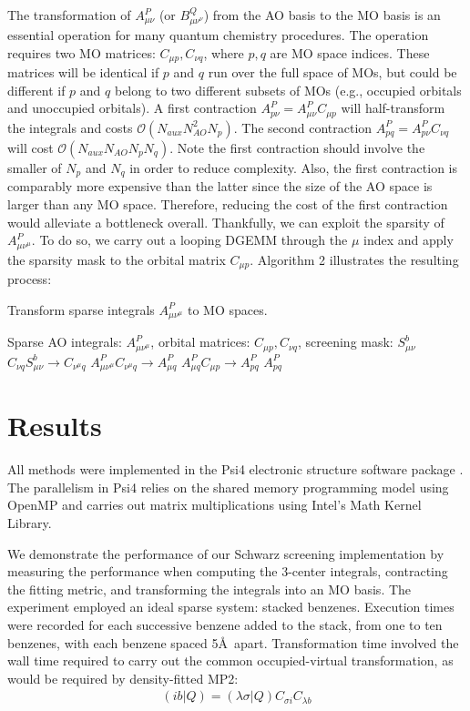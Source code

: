 The transformation of $A_{\mu \nu}^P$ (or $B_{\mu \nu^\nu}^Q$) from the AO basis to the MO basis is 
an essential operation for many quantum 
chemistry procedures. The operation requires two MO matrices: $C_{\mu p}, C_{\nu q}$, where $p, q$ are MO space
indices. These matrices will be identical if $p$ and $q$ run over the full space of MOs, but could be different if $p$ and $q$
belong to two different subsets of MOs (e.g., occupied orbitals and unoccupied orbitals).
A first contraction $A_{p \nu}^P=A_{\mu \nu}^PC_{\mu p}$ will half-transform the integrals and costs 
$\mathcal{O}(N_{aux}N_{AO}^2N_p)$. The second contraction $A_{p q}^P=A_{p \nu}^PC_{\nu q}$ will cost
$\mathcal{O}(N_{aux}N_{AO}N_pN_q)$.
Note the first contraction should involve the smaller of $N_p$ and $N_q$ in order to reduce complexity. Also, the first contraction
is comparably more expensive than the latter since the size of the AO space is larger than any MO space. Therefore,
reducing the cost of the first contraction would alleviate a bottleneck overall. 
Thankfully, we can exploit the sparsity of $A_{\mu \nu^\mu}^P$.
To do so, we carry out a looping DGEMM through the $\mu$ index and apply the sparsity mask to the orbital matrix $C_{\mu p}$.
Algorithm 2 illustrates the resulting process:

\begin{algorithm}[H]
\caption{Transform sparse integrals $A_{\mu \nu^\mu}^P$ to MO spaces.}
\begin{algorithmic}
\REQUIRE Sparse AO integrals: $A_{\mu \nu^\mu}^P$, orbital matrices: $C_{\mu p}, C_{\nu q}$, screening mask: $S_{\mu \nu}^b$
    \STATE $C_{\nu q}S_{\mu \nu}^b \rightarrow C_{\nu^{\mu} q}$
    \STATE $A_{\mu \nu^{\mu}}^P C_{\nu^{\mu} q} \rightarrow A_{\mu q}^P$
\ENDFOR
\STATE $A_{\mu q}^PC_{\mu p} \rightarrow A_{p q}^P$
\RETURN $A_{p q}^P$
\end{algorithmic}
\end{algorithm}


\section{Results}

All methods were implemented in the {\sc Psi4} electronic structure software package \cite{Parrish:2017:3185}.
The parallelism in {\sc Psi4} relies on the shared memory programming model using OpenMP 
and carries out matrix multiplications using Intel's Math Kernel
Library. 

We demonstrate the performance of our Schwarz screening implementation 
by measuring the performance when computing the 3-center integrals, contracting the fitting metric,
and transforming the integrals into an MO basis.
The experiment employed an ideal sparse system: stacked benzenes. Execution times were recorded for each successive benzene
added to the stack, from one to ten benzenes, with each benzene spaced 5\AA\ apart.
Transformation time involved the wall time required to carry out the common occupied-virtual
transformation, as would be required by density-fitted MP2: 
\begin{align} 
(i b | Q) = (\lambda \sigma | Q) C_{\sigma i} C_{\lambda b} 
\end{align}


